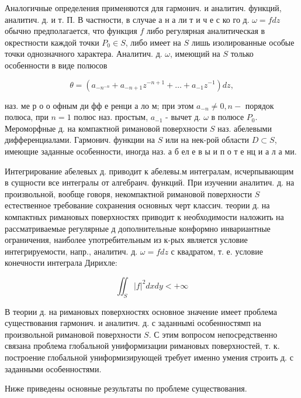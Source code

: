 \documentclass[10pt]{article}
\begin{document}
Аналогичные определения применяются для гармонич. и аналитич. функций, аналитич. д. и т. П. В частности, в случае а н а ли т и ч е с ко го д. $\omega=f d z$ обычно предполагается, что функция $f$ либо регулярная аналитическая в окрестности каждой точки $P_{0} \in S$, либо имеет на $S$ лишь изолированные особые точки однозначного характера. Аналитич. д. $\omega$, имеющий на $S$ только особенности в виде полюсов



\[

\theta=\left(a_{-n^{-n}}+a_{-n+1} z^{-n+1}+\ldots+a_{-1} z^{-1}\right) d z,

\]



наз. ме р о о офным ди фф е ренци а ло м; при этом $a_{-n} \neq 0, n-$ порядок полюса, при $n=1$ полюс наз. простым, $a_{-1}$ - вычет д. $\omega$ в полюсе $P_{0}$. Мероморфные д. на компактной римановой поверхности $S$ наз. абелевыми дифференциалами. Гармонич. функции на $S$ или на нек-рой области $D \subset S$, имеющие заданные особенности, иногда наз. а б ел е в ы и п о т е нц и а л а ми.



Интегрирование абелевых д. приводит к абелевы.м интегралам, исчерпывающим в сущности все интегралы от алгебраич. функций. При изучении аналитич. д. на произвольной, вообще говоря, некомпактной римановой поверхности $S$ естественное требование сохранения основных черт классич. теории д. на компактных римановых поверхностях приводит к необходимости наложить на рассматриваемые регулярные д дополнительные конформно инвариантные ограничения, наиболее употребительным из к-рых является условие интегрируемости, напр., аналитич. д. $\omega=f d z$ с квадратом, т. е. условие конечности интеграла Дирихле:



\[

\iint_{S}|f|^{2} d x d y<+\infty

\]



В теории д. на римановых поверхностях основное значение имеет проблема существования гармонич. и аналитич. д. с заданнымі особенностямп на произвольной римановой поверхности $S$. С этим вопросом непосредственно связана проблема глобальной униформизации римановых поверхностей, т. к. построение глобальной униформизирующей требует именно умения строить д. с заданными особенностями.



Ниже приведены основные результаты по проблеме существования.
\end{document}
